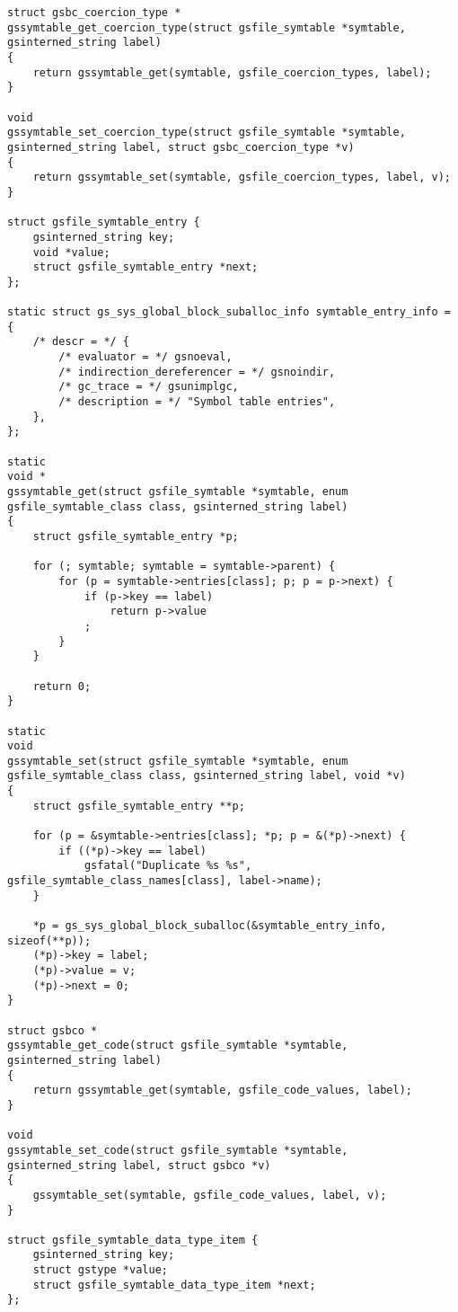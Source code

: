 \documentclass{report}
\begin{document}
\begin{verbatim}
struct gsbc_coercion_type *
gssymtable_get_coercion_type(struct gsfile_symtable *symtable, gsinterned_string label)
{
    return gssymtable_get(symtable, gsfile_coercion_types, label);
}

void
gssymtable_set_coercion_type(struct gsfile_symtable *symtable, gsinterned_string label, struct gsbc_coercion_type *v)
{
    return gssymtable_set(symtable, gsfile_coercion_types, label, v);
}

struct gsfile_symtable_entry {
    gsinterned_string key;
    void *value;
    struct gsfile_symtable_entry *next;
};

static struct gs_sys_global_block_suballoc_info symtable_entry_info = {
    /* descr = */ {
        /* evaluator = */ gsnoeval,
        /* indirection_dereferencer = */ gsnoindir,
        /* gc_trace = */ gsunimplgc,
        /* description = */ "Symbol table entries",
    },
};

static
void *
gssymtable_get(struct gsfile_symtable *symtable, enum gsfile_symtable_class class, gsinterned_string label)
{
    struct gsfile_symtable_entry *p;

    for (; symtable; symtable = symtable->parent) {
        for (p = symtable->entries[class]; p; p = p->next) {
            if (p->key == label)
                return p->value
            ;
        }
    }

    return 0;
}

static
void
gssymtable_set(struct gsfile_symtable *symtable, enum gsfile_symtable_class class, gsinterned_string label, void *v)
{
    struct gsfile_symtable_entry **p;

    for (p = &symtable->entries[class]; *p; p = &(*p)->next) {
        if ((*p)->key == label)
            gsfatal("Duplicate %s %s", gsfile_symtable_class_names[class], label->name);
    }

    *p = gs_sys_global_block_suballoc(&symtable_entry_info, sizeof(**p));
    (*p)->key = label;
    (*p)->value = v;
    (*p)->next = 0;
}

struct gsbco *
gssymtable_get_code(struct gsfile_symtable *symtable, gsinterned_string label)
{
    return gssymtable_get(symtable, gsfile_code_values, label);
}

void
gssymtable_set_code(struct gsfile_symtable *symtable, gsinterned_string label, struct gsbco *v)
{
    gssymtable_set(symtable, gsfile_code_values, label, v);
}

struct gsfile_symtable_data_type_item {
    gsinterned_string key;
    struct gstype *value;
    struct gsfile_symtable_data_type_item *next;
};


\end{verbatim}
\end{document}
